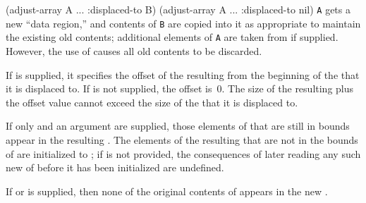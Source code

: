 \code
 (adjust-array A ... :displaced-to B)
 (adjust-array A ... :displaced-to nil)
\endcode
{\tt A} gets a
new ``data region,'' and contents of {\tt B} are copied into it as appropriate to
maintain the existing old contents; additional elements of {\tt A} 
are taken from
 if supplied.  However, 
the use of  causes all old contents
to be discarded.
\endlist
{}
                      
If  is supplied,
it specifies the offset
of the resulting  from the beginning of 
the  that it is displaced to.           
If  is not supplied, the offset is~0.  
The size of the resulting  plus the 
offset value cannot exceed the size of
the  that it is displaced to.

If only 
and an  argument are supplied,
those elements of  that
are still in bounds appear in the resulting . The elements of
the resulting  that are not in the bounds of 
 are initialized
to ; if  is not provided,
the consequences of later reading any such new  of 
before it has been initialized
are undefined.

If  or  is supplied,
then none of the original contents of  appears in the new .


%

